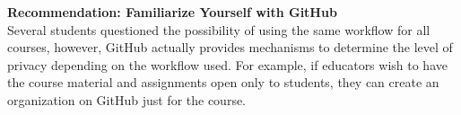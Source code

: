 



\textbf{Recommendation: Familiarize Yourself with GitHub}\\
Several students questioned the possibility of using the same workflow for all courses, however, GitHub actually provides mechanisms to determine the level of privacy depending on the workflow used. For example, if educators wish to have the course material and assignments open only to students, they can create an organization on GitHub just for the course.

